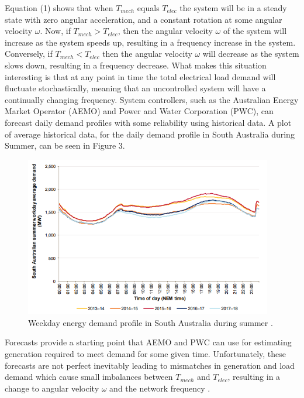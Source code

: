 \documentclass[12pt, a4paper]{article}
\begin{document}
Equation (1) shows that when $T_{mech}$ equals $T_{elec}$ the system will be in a steady state with zero angular acceleration, and a constant rotation at some angular velocity $\omega$. Now, if $T_{mech} > T_{elec}$, then the angular velocity $\omega$ of the system will increase as the system speeds up, resulting in a frequency increase in the system. Conversely, if $T_{mech} < T_{elec}$ then the angular velocity $\omega$ will decrease as the system slows down, resulting in a frequency decrease. What makes this situation interesting is that at any point in time the total electrical load demand will fluctuate stochastically, meaning that an uncontrolled system will have a continually changing frequency. System controllers, such as the Australian Energy Market Operator (AEMO) and Power and Water Corporation (PWC), can forecast daily demand profiles with some reliability using historical data. A plot of average historical data, for the daily demand profile in South Australia during Summer, can be seen in Figure 3.  
\begin{figure}[h]
	\centering
	\includegraphics[height=7cm]{load_profile}
	\caption{Weekday energy demand profile in South Australia during summer \cite{AEMO2018}.}
\end{figure}

Forecasts provide a starting point that AEMO and PWC can use for estimating generation required to meet demand for some given time. Unfortunately, these forecasts are not perfect inevitably leading to mismatches in generation and load demand which cause small imbalances between $T_{mech}$ and $T_{elec}$, resulting in a change to angular velocity $\omega$ and the network frequency \cite{Glover2012}.\\ 
\end{document}
